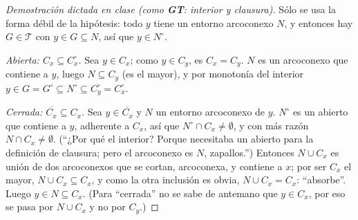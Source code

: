 \documentclass[11pt,a4paper]{article}
\newcommand{\figtit}[1]{\par\vspace{2pt}{\footnotesize\itshape #1}\par}
\theoremstyle{definition}
\theoremstyle{plain}
\newcommand{\cl}[1]{\overline{#1}}
\newcommand{\tp}{\mathcal{T}}
\begin{document}
\begin{proof}[Demostración dictada en clase (como \textbf{GT}: interior y clausura)]
Sólo se usa la forma débil de la hipótesis: todo $y$ tiene un entorno arcoconexo $N$, y entonces hay $G\in\tp$ con $y\in G\subseteq N$, así que $y\in N^\circ$.

\emph{Abierta: $C_x\subseteq C_x^\circ$.} Sea $y\in C_x$; como $y\in C_y$, es $C_x=C_y$. $N$ es un arcoconexo que contiene a $y$, luego $N\subseteq C_y$ (es el mayor), y por monotonía del interior $y\in G=G^\circ\subseteq N^\circ\subseteq C_y^\circ=C_x^\circ$.

\emph{Cerrada: $\cl{C_x}\subseteq C_x$.} Sea $y\in\cl{C_x}$ y $N$ un entorno arcoconexo de $y$. $N^\circ$ es un abierto que contiene a $y$, adherente a $C_x$, así que $N^\circ\cap C_x\ne\emptyset$, y con más razón $N\cap C_x\ne\emptyset$. (``¿Por qué el interior? Porque necesitaba un abierto para la definición de clausura; pero el arcoconexo es $N$, zapallos.'') Entonces $N\cup C_x$ es unión de dos arcoconexos que se cortan, arcoconexa, y contiene a $x$; por ser $C_x$ el mayor, $N\cup C_x\subseteq C_x$, y como la otra inclusión es obvia, $N\cup C_x=C_x$: ``absorbe''. Luego $y\in N\subseteq C_x$. (Para ``cerrada'' no se sabe de antemano que $y\in C_x$, por eso se pasa por $N\cup C_x$ y no por $C_y$.)
\end{proof}

\begin{figure}[ht]
\centering
{}
\figtit{Figura 24. Por qué $C_x$ es cerrada en un localmente arcoconexo (dibujo de la clase 12): un punto adherente $y$ tiene un entorno arcoconexo $N$ que pisa a $C_x$; la unión es un arcoconexo que contiene a $x$, cabe en $C_x$, y arrastra a $y$ con ella.}
\end{figure}
\end{document}

